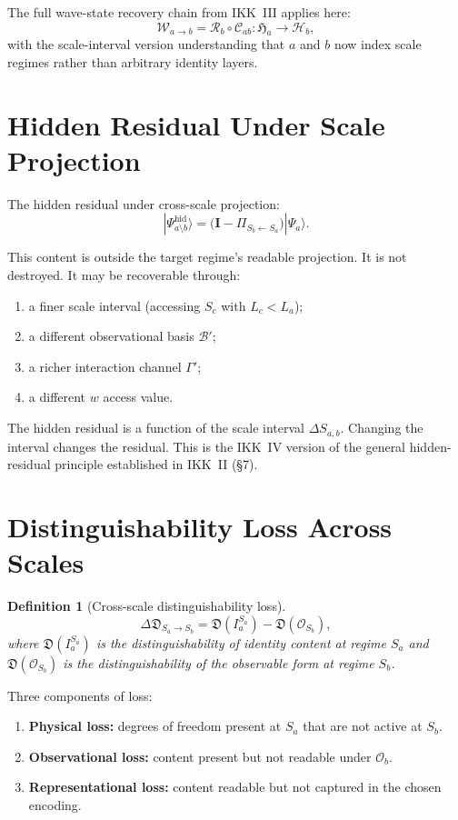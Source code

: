 \documentclass[11pt,a4paper,oneside]{article}
\newtheorem{definition}{Definition}[section]
\newcommand{\Ia}{I_a}                               %
\newcommand{\Ha}{\mathfrak{H}_a}               %
\newcommand{\Hb}{\mathcal{H}_b}               %
\newcommand{\OspS}[1]{\mathcal{O}_{S_{#1}}}  %
\newcommand{\DSab}{\Delta S_{a,b}}             %
\newcommand{\wcoord}{w}
\newcommand{\PiS}[2]{\Pi_{S_{#2}\leftarrow S_{#1}}}  %
\newcommand{\Wab}{\mathcal{W}_{a\to b}}        %
\newcommand{\Cab}{\mathcal{C}_{ab}}            %
\newcommand{\Rab}{\mathcal{R}_b}               %
\newcommand{\D}{\mathfrak{D}}                  %
\begin{document}
The full wave-state recovery chain from IKK~III applies here:
\[
\Wab = \Rab \circ \Cab : \Ha \longrightarrow \Hb,
\]
with the scale-interval version understanding that $a$ and $b$ now index scale regimes rather than arbitrary identity layers.

\section{Hidden Residual Under Scale Projection}

The hidden residual under cross-scale projection:
\[
\boxed{|\Psi^{\mathrm{hid}}_{a\setminus b}\rangle = \big(\mathbf{I} - \PiS{a}{b}\big)|\Psi_a\rangle.}
\]

This content is outside the target regime's readable projection. It is not destroyed. It may be recoverable through:
\begin{enumerate}
\item a finer scale interval (accessing $S_c$ with $L_c < L_a$);
\item a different observational basis $\mathcal{B}'$;
\item a richer interaction channel $\Gamma'$;
\item a different $\wcoord$ access value.
\end{enumerate}

The hidden residual is a function of the scale interval $\DSab$. Changing the interval changes the residual. This is the IKK~IV version of the general hidden-residual principle established in IKK~II (\S{}7).

\section{Distinguishability Loss Across Scales}

\begin{definition}[Cross-scale distinguishability loss]
\[
\Delta\D_{S_a \to S_b} = \D(\Ia^{S_a}) - \D(\OspS{b}),
\]
where $\D(\Ia^{S_a})$ is the distinguishability of identity content at regime $S_a$ and $\D(\OspS{b})$ is the distinguishability of the observable form at regime $S_b$.
\end{definition}

Three components of loss:
\begin{enumerate}
\item \textbf{Physical loss:} degrees of freedom present at $S_a$ that are not active at $S_b$.
\item \textbf{Observational loss:} content present but not readable under $\mathcal{O}_b$.
\item \textbf{Representational loss:} content readable but not captured in the chosen encoding.
\end{enumerate}
\end{document}
